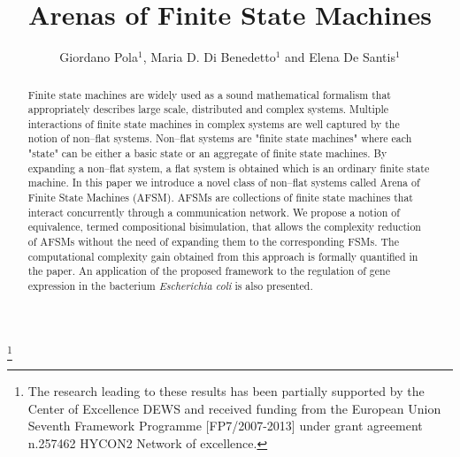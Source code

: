 \documentclass{amsart}
\theoremstyle{definition}
\theoremstyle{remark}
\numberwithin{equation}{section}
\begin{document}
\begin{abstract}                          Finite state machines are widely used as a sound mathematical formalism that appropriately describes large scale, distributed and complex systems. 
Multiple interactions of finite state machines in complex systems are well captured by the notion of non--flat systems. Non--flat systems are "finite state machines" where each "state" can be either a basic state or an aggregate of finite state machines. 
By expanding a non--flat system, a flat system is obtained which is an ordinary finite state machine. 
In this paper we introduce a novel class of non--flat systems called Arena of Finite State Machines (AFSM). AFSMs are collections of finite state machines that interact concurrently through a communication network. We propose a notion of equivalence, termed compositional bisimulation, that allows the complexity reduction of AFSMs without the need of expanding them to the corresponding FSMs. The computational complexity gain obtained from this approach is formally quantified in the paper. An application of the proposed framework to the regulation of gene expression in the bacterium \textit{Escherichia coli} is also presented.
\end{abstract}

\title[Arenas of Finite State Machines]{Arenas of Finite State Machines}
\thanks{The research leading to these results has been partially supported by the Center of Excellence DEWS and received funding from the European Union Seventh Framework Programme [FP7/2007-2013] under grant agreement n.257462 HYCON2 Network of excellence.}

\author[Giordano Pola, Maria D. Di Benedetto and Elena De Santis]{
Giordano Pola$^{1}$, Maria D. Di Benedetto$^{1}$ and Elena De Santis$^{1}$}
\address{$^{1}$
Department of Electrical and Information Engineering, Center of Excellence DEWS,
University of L{'}Aquila, Poggio di Roio, 67040 L{'}Aquila, Italy}

\maketitle
\end{document}
